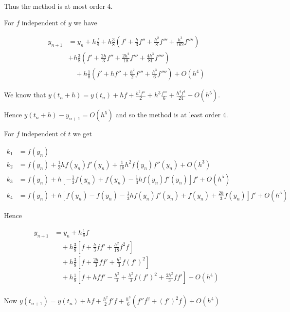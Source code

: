 \documentclass[a4paper]{article}
\begin{document}
Thus the method is at most order 4.

For $ f $ independent of $ y $ we have 

\begin{align*}
y_{n+1} & = y_{n} + h \frac{f}{8} + h \frac{3}{8}\left(  f' + \frac{h}{3} f'' + \frac{h^{2}}{8} f''' + \frac{h^{3}}{162}f'''' \right)    \\
& + h \frac{3}{8}\left(  f' + \frac{2h}{3} f'' + \frac{2h^{2}}{18} f''' + \frac{4h^{3}}{81}f'''' \right)  \\
& \quad + h \frac{1}{8}\left(  f' + h f'' + \frac{h^{2}}{2} f''' + \frac{h^{3}}{6} f'''' \right)  +  O(h^{4}) 
\end{align*}



We know that $ y(t_{n} + h ) = y(t_{n}) + h f + \frac{h^{2}f''}{2} + h^{3} \frac{f'''}{6} + \frac{h^{4} f^{4}}{24} + O(h^{5}) $.

Hence $ y(t_{n} + h) - y_{n+1} = O(h^{5}) $ and so the method is at least order 4.

For $ f $ independent of $ t $ we get

\begin{align*}
k_{1} & = f(y_{n}) \\
k_{2} & = f(y_{n}) + \frac{1}{3} h f(y_{n}) f'(y_{n}) + \frac{1}{18} h^{2} f(y_{n}) f''(y_{n}) + O(h^{3}) \\
k_{3} & = f(y_{n}) + h  \left[ - \frac{1}{3} f(y_{n}) +  f(y_{n}) - \frac{1}{3}  h f(y_{n}) f'(y_{n}) \right] f' + O(h^{5}) \\
k_{4} & = f(y_{n}) + h  \left[ f(y_{n}) -  f(y_{n}) - \frac{1}{3}  h f(y_{n}) f'(y_{n})  + f(y_{n}) + \frac{2h}{3} f(y_{n}) \right] f' + O(h^{5}) 
\end{align*}


Hence 

\begin{align*}
y_{n+1} & = y_{n} + h \frac{1}{8} f  \\
& \quad +  h \frac{3}{8} \left[   f + \frac{h}{3} f f' + \frac{h^{2}}{18} f^{2} f  \right] \\
& \quad +  h \frac{3}{8} \left[   f + \frac{2h}{3} f f' + \frac{h^{2}}{3} f (f')^{2}  \right] \\
& \quad +  h \frac{1}{8} \left[   f + h f f' - \frac{h^{2}}{3} + \frac{h^{2}}{3} f (f')^{2}  + \frac{2h^{2}}{3} f f' \right] + O(h^{4})  \\
\end{align*}

Now $ y(t_{n+1}) = y(t_{n}) + hf + \frac{h^{2}}{2} f' f + \frac{h^{3}}{6} \left(   f'' f^{2} + (f')^{2} f  \right) + O(h^{4})  $
\end{document}
